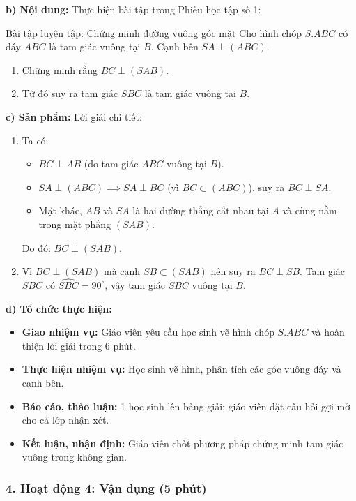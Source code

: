 \documentclass[12pt, a4paper]{article}
\begin{document}
\noindent \textbf{b) Nội dung:}
Thực hiện bài tập trong Phiếu học tập số 1:
\begin{pedabox}{Bài tập luyện tập: Chứng minh đường vuông góc mặt}
Cho hình chóp $S.ABC$ có đáy $ABC$ là tam giác vuông tại $B$. Cạnh bên $SA \perp (ABC)$.
\begin{enumerate}[leftmargin=0.6cm]
    \item Chứng minh rằng $BC \perp (SAB)$.
    \item Từ đó suy ra tam giác $SBC$ là tam giác vuông tại $B$.
\end{enumerate}
\end{pedabox}

\noindent \textbf{c) Sản phẩm:}
Lời giải chi tiết:
\begin{enumerate}[leftmargin=0.6cm]
    \item Ta có:
    \begin{itemize}
        \item $BC \perp AB$ (do tam giác $ABC$ vuông tại $B$).
        \item $SA \perp (ABC) \implies SA \perp BC$ (vì $BC \subset (ABC)$), suy ra $BC \perp SA$.
        \item Mặt khác, $AB$ và $SA$ là hai đường thẳng cắt nhau tại $A$ và cùng nằm trong mặt phẳng $(SAB)$.
    \end{itemize}
    Do đó: $BC \perp (SAB)$.
    \item Vì $BC \perp (SAB)$ mà cạnh $SB \subset (SAB)$ nên suy ra $BC \perp SB$.
    Tam giác $SBC$ có $\widehat{SBC} = 90^\circ$, vậy tam giác $SBC$ vuông tại $B$.
\end{enumerate}

\noindent \textbf{d) Tổ chức thực hiện:}
\begin{itemize}[leftmargin=0.6cm]
    \item \textbf{Giao nhiệm vụ:} Giáo viên yêu cầu học sinh vẽ hình chóp $S.ABC$ và hoàn thiện lời giải trong 6 phút.
    \item \textbf{Thực hiện nhiệm vụ:} Học sinh vẽ hình, phân tích các góc vuông đáy và cạnh bên.
    \item \textbf{Báo cáo, thảo luận:} 1 học sinh lên bảng giải; giáo viên đặt câu hỏi gợi mở cho cả lớp nhận xét.
    \item \textbf{Kết luận, nhận định:} Giáo viên chốt phương pháp chứng minh tam giác vuông trong không gian.
\end{itemize}

\subsubsection*{4. Hoạt động 4: Vận dụng (5 phút)}
\end{document}
